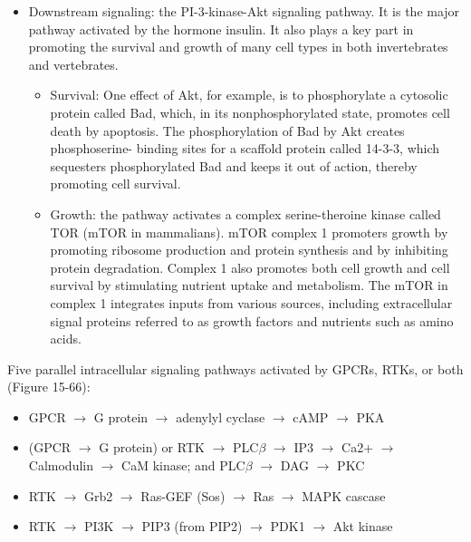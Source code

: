\documentclass{report}
\begin{document}
\begin{enumerate}
\begin{itemize}
\item Downstream signaling: the PI-3-kinase-Akt signaling pathway. It is the major pathway activated by the hormone insulin. It also plays a key part in promoting the survival and growth of many cell types in both invertebrates and vertebrates.
\begin{itemize}
	\item Survival: One effect of Akt, for example, is to phosphorylate a cytosolic protein called Bad, which, in its nonphosphorylated state, promotes cell death by apoptosis. The phosphorylation of Bad by Akt creates phosphoserine- binding sites for a scaffold protein called 14-3-3, which sequesters phosphorylated Bad and keeps it out of action, thereby promoting cell survival. 	
	\item Growth: the pathway activates a complex serine-theroine kinase called TOR (mTOR in mammalians). mTOR complex 1 promoters growth by promoting ribosome production and protein synthesis and by inhibiting protein degradation. Complex 1 also promotes both cell growth and cell survival by stimulating nutrient uptake and metabolism. The mTOR in complex 1 integrates inputs from various sources, including extracellular signal proteins referred to as growth factors and nutrients such as amino acids. 
\end{itemize}
\end{itemize}

Five parallel intracellular signaling pathways activated by GPCRs, RTKs, or both (Figure 15-66):
\begin{itemize}
\item GPCR $\rightarrow$ G protein $\rightarrow$ adenylyl cyclase $\rightarrow$ cAMP $\rightarrow$ PKA
\item (GPCR $\rightarrow$ G protein) or RTK $\rightarrow$ PLC$\beta$ $\rightarrow$ IP3 $\rightarrow$ Ca2+ $\rightarrow$ Calmodulin $\rightarrow$ CaM kinase; and PLC$\beta$ $\rightarrow$ DAG $\rightarrow$ PKC
\item RTK $\rightarrow$ Grb2 $\rightarrow$ Ras-GEF (Sos) $\rightarrow$ Ras $\rightarrow$ MAPK cascase
\item RTK $\rightarrow$ PI3K $\rightarrow$ PIP3 (from PIP2) $\rightarrow$ PDK1 $\rightarrow$ Akt kinase
\end{itemize}


\end{enumerate}
\end{document}
